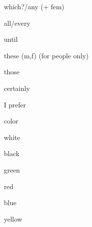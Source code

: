 \begin{flashcard}{\LARGE which?/any (+ fem)}
\LARGE {}
\end{flashcard}
\begin{flashcard}{\LARGE all/every}
\LARGE {}
\end{flashcard}
\begin{flashcard}{\LARGE until}
\LARGE {}
\end{flashcard}
\begin{flashcard}{\LARGE these (m,f) (for people only)}
\LARGE {}
\end{flashcard}
\begin{flashcard}{\LARGE those}
\LARGE {}
\end{flashcard}
\begin{flashcard}{\LARGE certainly}
\LARGE {}
\end{flashcard}
\begin{flashcard}{\LARGE I prefer}
\LARGE {}
\end{flashcard}
\begin{flashcard}{\LARGE color}
\LARGE {}
\end{flashcard}
\begin{flashcard}{\LARGE white}
\LARGE {}
\end{flashcard}
\begin{flashcard}{\LARGE black}
\LARGE {}
\end{flashcard}
\begin{flashcard}{\LARGE green}
\LARGE {}
\end{flashcard}
\begin{flashcard}{\LARGE red}
\LARGE {}
\end{flashcard}
\begin{flashcard}{\LARGE blue}
\LARGE {}
\end{flashcard}
\begin{flashcard}{\LARGE yellow}
\LARGE {}
\end{flashcard}

